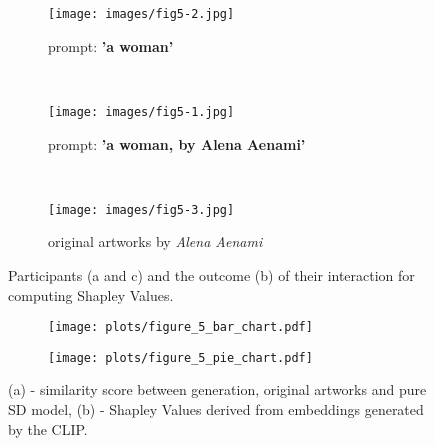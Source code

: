 \documentclass[12pt, letterpaper]{article}
\begin{document}
\begin{figure}[h]
    \centering
    
    \begin{subfigure}{\textwidth}
        \centering
        \texttt{[image: images/fig5-2.jpg]}
        \caption{prompt: \textbf{'a woman'}}
        \label{fig5:sub1}
    \end{subfigure}
    \\
    
    \begin{subfigure}{\textwidth}
        \centering
        \texttt{[image: images/fig5-1.jpg]}
        \caption{prompt: \textbf{'a woman, by Alena Aenami'}}
        \label{fig5:sub2}
    \end{subfigure}
    \\

    \begin{subfigure}{\textwidth}
        \centering
        \texttt{[image: images/fig5-3.jpg]}
        \caption{original artworks by \textit{Alena Aenami}}
        \label{fig5:sub3}
    \end{subfigure}    
    \caption{Participants (a and c) and the outcome (b) of their interaction for computing Shapley Values.}
    \label{fig5:stacked_images}
\end{figure}

\begin{figure}[h]
  \centering
  \begin{subfigure}[b]{0.6\textwidth}
    \texttt{[image: plots/figure\_5\_bar\_chart.pdf]}
    \caption{}
    \label{fig6:image1}
  \end{subfigure}%
  \begin{subfigure}[b]{0.4\textwidth}
    \texttt{[image: plots/figure\_5\_pie\_chart.pdf]}
    \caption{}
    \label{fig6:image2}
  \end{subfigure}
 \captionsetup{justification=centering}
  \caption{(a) - similarity score between generation, original artworks and pure SD model, (b) - Shapley Values derived from embeddings generated by the CLIP.}
  \label{fig6}
\end{figure}
\end{document}
